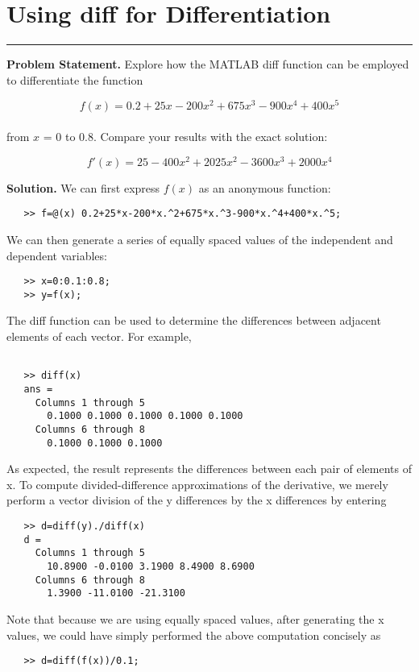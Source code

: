 \documentclass[../main.tex]{subfiles}
\begin{document}
\vspace{0,6in}
\section{Using diff for Differentiation}
\vspace{0,1in}
\hrule
\vspace{0,1in}

\textbf{Problem Statement.} Explore how the MATLAB diff function can be employed to differentiate the function

	$$f(x) = 0.2 + 25x - 200x^{2} + 675x^{3} - 900x^{4} + 400x^{5}$$\\
from $x$ = 0 to 0.8. Compare your results with the exact solution:

	$$f'(x) = 25 - 400x^{2} + 2025x^{2} - 3600x^{3} + 2000x^{4}$$
	
\textbf{Solution.} We can first express $f(x)$ as an anonymous function:

\begin{verbatim}
   >> f=@(x) 0.2+25*x-200*x.^2+675*x.^3-900*x.^4+400*x.^5;
\end{verbatim}
We can then generate a series of equally spaced values of the independent and dependent
variables:
\begin{verbatim}
   >> x=0:0.1:0.8;
   >> y=f(x);
\end{verbatim}
The diff function can be used to determine the differences between adjacent elements of
each vector. For example,
\begin{verbatim}
   
   >> diff(x)
   ans =
     Columns 1 through 5
       0.1000 0.1000 0.1000 0.1000 0.1000
     Columns 6 through 8
       0.1000 0.1000 0.1000
\end{verbatim}
As expected, the result represents the differences between each pair of elements of x. To
compute divided-difference approximations of the derivative, we merely perform a vector
division of the y differences by the x differences by entering
\begin{verbatim}
   >> d=diff(y)./diff(x)
   d =
     Columns 1 through 5
       10.8900 -0.0100 3.1900 8.4900 8.6900
     Columns 6 through 8
       1.3900 -11.0100 -21.3100
\end{verbatim}
Note that because we are using equally spaced values, after generating the x values, we
could have simply performed the above computation concisely as
\begin{verbatim}
   >> d=diff(f(x))/0.1;
\end{verbatim}
\end{document}
